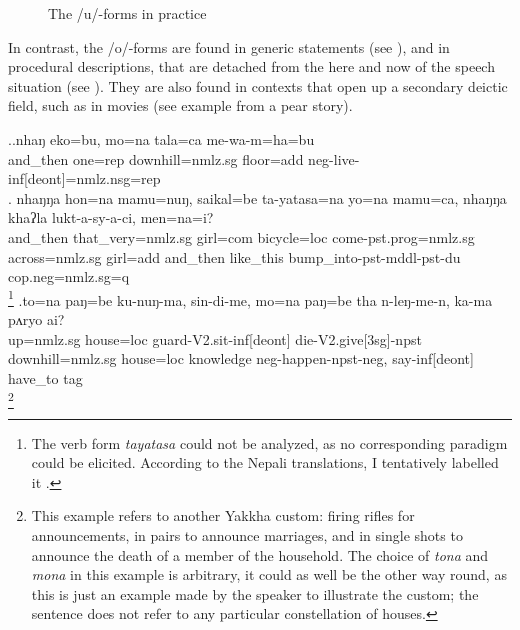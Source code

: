 \begin{figure}
\centering
\setlength{\fboxsep}{0pt}
\caption{The /u/-forms in practice}\label{deixill-1}
\end{figure}


	
	
In contrast, the /o/-forms are found in generic statements (see \Next[a]), and in procedural descriptions, that are detached from the here and now of the speech situation (see \Next[c]). They are also found in contexts that open up a secondary deictic field, such as in movies (see example  \Next[b] from a pear story). 

\ex.\ag.\label{mewamhabu}nhaŋ eko=bu,    mo=na tala=ca         me-wa-m=ha=bu\\
and\_then one{\sc =rep} downhill{\sc =nmlz.sg} floor{\sc =add} {\sc neg-}live{\sc -inf[deont]=nmlz.nsg=rep} \\
 
\bg. nhaŋŋa hon=na mamu=nuŋ, saikal=be ta-yatasa=na yo=na mamu=ca, nhaŋŋa khaʔla lukt-a-sy-a-ci,  men=na=i?	\\
	and\_then that\_very{\sc =nmlz.sg} girl{\sc =com} bicycle{\sc =loc} come{\sc [3sg]-pst.prog=nmlz.sg} across{\sc =nmlz.sg} girl{\sc =add} and\_then like\_this bump\_into{\sc -pst-mddl-pst-du} {\sc cop.neg=nmlz.sg=q}\\
\footnote{The verb form \emph{tayatasa} could not be analyzed, as no corresponding paradigm could be elicited. According to the Nepali translations, I tentatively labelled it .} 
\bg.to=na  paŋ=be     ku-nuŋ-ma, sin-di-me,  mo=na  paŋ=be     tha  n-leŋ-me-n, ka-ma pʌryo  ai?\\
up{\sc =nmlz.sg} house{\sc =loc} guard{\sc -V2.sit-inf[deont]} die{\sc -V2.give[3sg]-npst} downhill{\sc =nmlz.sg} house{\sc =loc} knowledge {\sc neg-}happen{\sc [3sg]-npst-neg}, say{\sc -inf[deont]} have\_to {\sc tag}\\
\footnote{This example refers to another Yakkha custom: firing rifles for announcements, in pairs to announce marriages, and in single shots to announce the death of a  member of the household. The choice of \emph{tona} and \emph{mona} in this example is arbitrary, it could as well be the other way round, as this is just an example made by the speaker to illustrate the custom; the sentence does not refer to any particular constellation of houses.} 	 
   			
